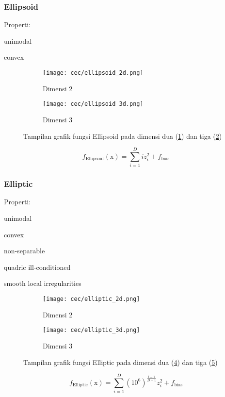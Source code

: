 \subsubsection{Ellipsoid}
\noindent Properti:
\begin{packed_item}
  \item unimodal
  \item convex
\end{packed_item}
\begin{figure}[H]
	\centering
	\begin{subfigure}[b]{0.4\textwidth}
		\centering
		\texttt{[image: cec/ellipsoid\_2d.png]}
		\caption{Dimensi 2}
		\label{fig:ellipsoid-2d}
	\end{subfigure}
	\hfill
	\begin{subfigure}[b]{0.4\textwidth}
		\centering
		\texttt{[image: cec/ellipsoid\_3d.png]}
		\caption{Dimensi 3}
		\label{fig:ellipsoid-3d}
	\end{subfigure}
	\caption{Tampilan grafik fungsi Ellipsoid pada dimensi dua (\cref{fig:ellipsoid-2d}) dan tiga (\cref{fig:ellipsoid-3d})}
	\label{fig:ellipsoid}
\end{figure}
\begin{equation}
  f_{\text{Ellipsoid}}(\mathrm{x})=\sum_{i=1}^{D}iz_i^2  +f_{\text{bias}}
\end{equation}

\subsubsection{Elliptic}
\noindent Properti:
\begin{packed_item}
  \item unimodal
  \item convex
  \item non-separable
  \item quadric ill-conditioned
  \item smooth local irregularities
\end{packed_item}
\begin{figure}[H]
	\centering
	\begin{subfigure}[b]{0.4\textwidth}
		\centering
		\texttt{[image: cec/elliptic\_2d.png]}
		\caption{Dimensi 2}
		\label{fig:elliptic-2d}
	\end{subfigure}
	\hfill
	\begin{subfigure}[b]{0.4\textwidth}
		\centering
		\texttt{[image: cec/elliptic\_3d.png]}
		\caption{Dimensi 3}
		\label{fig:elliptic-3d}
	\end{subfigure}
	\caption{Tampilan grafik fungsi Elliptic pada dimensi dua (\cref{fig:elliptic-2d}) dan tiga (\cref{fig:elliptic-3d})}
	\label{fig:elliptic}
\end{figure}
\begin{equation}
  f_{\text{Elliptic}}(\mathrm{x})= \sum_{i=1}^{D} \left( 10^6\right)^{\frac{i-1}{D-1}} z_i^2 +f_{\text{bias}}
\end{equation}

